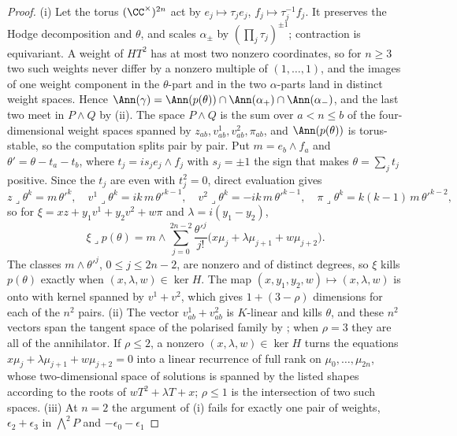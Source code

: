 \begin{proof}
(i) Let the torus $(\CC^{\times})^{2n}$ act by $e_{j}\mapsto\tau_{j}e_{j}$,
$f_{j}\mapsto\tau_{j}^{-1}f_{j}$. It preserves the Hodge decomposition and
$\theta$, and scales $\alpha_{\pm}$ by $(\prod_{j}\tau_{j})^{\pm1}$;
contraction is equivariant. A weight of $HT^{2}$ has at most two nonzero
coordinates, so for $n\ge3$ two such weights never differ by a nonzero
multiple of $(1,\dots,1)$, and the images of one weight component in the
$\theta$-part and in the two $\alpha$-parts land in distinct weight spaces.
Hence $\Ann(\gamma)=\Ann(p(\theta))\cap\Ann(\alpha_{+})\cap\Ann(\alpha_{-})$,
and the last two meet in $P\wedge Q$ by (ii). The space
$P\wedge Q$ is the sum over $a<n\le b$ of the four-dimensional weight spaces
spanned by $z_{ab},v^{1}_{ab},v^{2}_{ab},\pi_{ab}$, and $\Ann(p(\theta))$ is
torus-stable, so the computation splits pair by pair. Put
$m=e_{b}\wedge f_{a}$ and $\theta'=\theta-t_{a}-t_{b}$, where
$t_{j}=i s_{j}e_{j}\wedge f_{j}$ with $s_{j}=\pm1$ the sign that makes
$\theta=\sum_{j}t_{j}$ positive. Since the $t_{j}$ are even with
$t_{j}^{2}=0$, direct evaluation gives
\[
  z\lrcorner\theta^{k}=m\,\theta'^{k},\quad
  v^{1}\lrcorner\theta^{k}=ik\,m\,\theta'^{k-1},\quad
  v^{2}\lrcorner\theta^{k}=-ik\,m\,\theta'^{k-1},\quad
  \pi\lrcorner\theta^{k}=k(k-1)\,m\,\theta'^{k-2},
\]
so for $\xi=xz+y_{1}v^{1}+y_{2}v^{2}+w\pi$ and $\lambda=i(y_{1}-y_{2})$,
\[
  \xi\lrcorner p(\theta)=m\wedge\sum_{j=0}^{2n-2}\frac{\theta'^{j}}{j!}
  \bigl(x\mu_{j}+\lambda\mu_{j+1}+w\mu_{j+2}\bigr).
\]
The classes $m\wedge\theta'^{j}$, $0\le j\le2n-2$, are nonzero and of distinct
degrees, so $\xi$ kills $p(\theta)$ exactly when $(x,\lambda,w)\in\ker H$.
The map $(x,y_{1},y_{2},w)\mapsto(x,\lambda,w)$ is onto with kernel spanned by
$v^{1}+v^{2}$, which gives $1+(3-\rho)$ dimensions for each of the $n^{2}$
pairs. (ii) The vector $v^{1}_{ab}+v^{2}_{ab}$ is $K$-linear and kills
$\theta$, and these $n^{2}$ vectors span the tangent space of the polarised
family by ; when $\rho=3$ they are all of the
annihilator. If $\rho\le2$, a nonzero $(x,\lambda,w)\in\ker H$ turns the
equations $x\mu_{j}+\lambda\mu_{j+1}+w\mu_{j+2}=0$ into a linear recurrence of
full rank on $\mu_{0},\dots,\mu_{2n}$, whose two-dimensional space of
solutions is spanned by the listed shapes according to the roots of
$wT^{2}+\lambda T+x$; $\rho\le1$ is the intersection of two such spaces.
(iii) At $n=2$ the argument of (i) fails for exactly one pair of weights,
$\epsilon_{2}+\epsilon_{3}$ in $\bigwedge^{2}P$ and $-\epsilon_{0}-\epsilon_{1}$

\end{proof}
